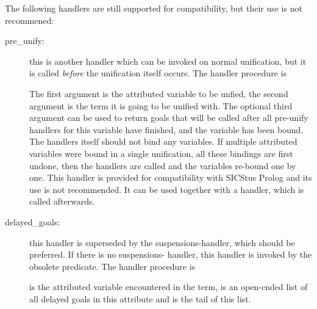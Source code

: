 The following handlers are still supported for compatibility,
but their use is not recommened:
\begin{description}
\item [pre_unify:]
  this is another handler which can be invoked on
normal unification, but it is called \emph{before} the unification
itself occurs.
The handler procedure is
\begin{quote}
\end{quote}
The first argument is the attributed variable to be unfied,
the second argument is the term it is going to be unified with.
The optional third argument can be used to return goals that
will be called after all pre-unify handlers for this variable
have finished, and the variable has been bound.
The handlers itself should not bind any variables.
If multiple attributed variables were bound in a single
unification, all these bindings are first undone, then the
handlers are called and the variables re-bound one by one.
This handler is provided for compatibility with SICStus
Prolog and its use is not recommended. It can be used together
with a  handler, which is called afterwards.

\item [delayed_goals:]
  this handler is superseded by the
suspensions-handler, which should be preferred. If there is no suspensions-
handler, this handler is invoked by the obsolete
predicate.
The handler procedure is
\begin{quote}
\end{quote}
 is the attributed variable encountered in the
term,  is an open-ended list of all delayed
goals in this attribute and  is the
tail of this list.

\end{description}

